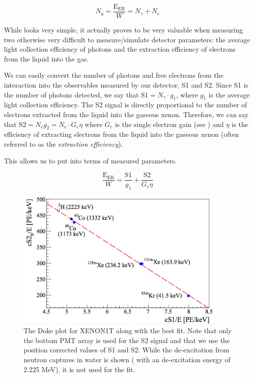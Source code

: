 \begin{equation}
        \label{eqn:xe1t_anticorrelation}
        N_q = \frac{\textrm{E}_{\textrm{ER}}}{W} = N_{\gamma} + N_{e}
\end{equation}

While  looks very simple, it actually proves to be very valuable when measuring two otherwise very difficult to measure/simulate detector parameters: the average light collection efficiency of photons and the extraction efficiency of electrons from the liquid into the gas.  

We can easily convert the number of photons and free electrons from the interaction into the observables measured by our detector, S1 and S2.  Since S1 is the number of photons detected, we say that $\textrm{S1} = N_{\gamma} \cdot g_1$, where $g_1$ is the average light collection efficiency.  The S2 signal is directly proportional to the number of electrons extracted from the liquid into the gaseous xenon.  Therefore, we can say that $\textrm{S2} = N_e g_2 = N_e \cdot G_e \eta$ where $G_e$ is the single electron gain (see ) and $\eta$ is the efficiency of extracting electrons from the liquid into the gaseous xenon (often referred to as the \textit{extraction efficiency}).

  This allows us to put  into terms of measured parameters.
  
\begin{equation}
        \label{eqn:xe1t_anticorrelation_s1_s2}
        \frac{\textrm{E}_{\textrm{ER}}}{W} = \frac{\textrm{S1}}{g_1} + \frac{\textrm{S2}}{G_e \eta}
\end{equation}
 
  \begin{figure}[t]
	\centering
	\includegraphics[width=0.95\textwidth]{xe1t_doke_plot}
	\caption{The Doke plot for XENON1T along with the best fit.  Note that only the bottom PMT array is used for the S2 signal and that we use the position corrected values of S1 and S2.  While the de-excitation from neutron captures in water is shown ( with an de-excitation energy of 2.225 MeV), it is not used for the fit.}
	\label{fig:xe1t_doke_plot}
\end{figure}

